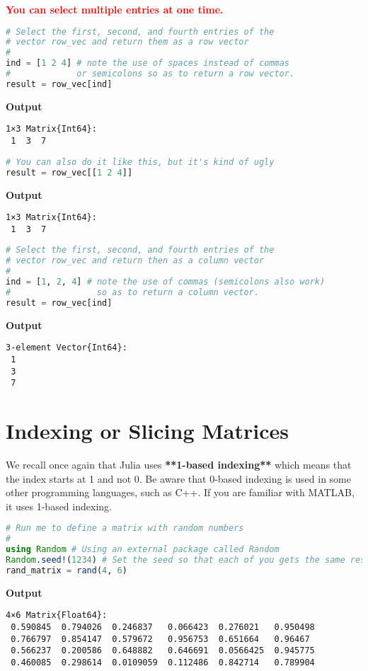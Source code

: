 \textcolor{red}{\bf You can select multiple entries at one time.}

\begin{lstlisting}[language=Julia,style=mystyle]
# Select the first, second, and fourth entries of the 
# vector row_vec and return them as a row vector
#
ind = [1 2 4] # note the use of spaces instead of commas 
#             or semicolons so as to return a row vector.
result = row_vec[ind]
\end{lstlisting}
\textbf{Output} 
\begin{verbatim}
1×3 Matrix{Int64}:
 1  3  7
\end{verbatim}


\begin{lstlisting}[language=Julia,style=mystyle]
# You can also do it like this, but it's kind of ugly
result = row_vec[[1 2 4]]
\end{lstlisting}
\textbf{Output} 
\begin{verbatim}
1×3 Matrix{Int64}:
 1  3  7
\end{verbatim}


\begin{lstlisting}[language=Julia,style=mystyle]
# Select the first, second, and fourth entries of the 
# vector row_vec and return then as a column vector
#
ind = [1, 2, 4] # note the use of commas (semicolons also work) 
#                 so as to return a column vector.
result = row_vec[ind]
\end{lstlisting}
\textbf{Output} 
\begin{verbatim}
3-element Vector{Int64}:
 1
 3
 7
\end{verbatim}

\section{Indexing or Slicing Matrices}

\begin{rem}
We recall once again that Julia uses \textbf{**1-based indexing**} which means that the index starts at 1 and not 0. Be aware that 0-based indexing is used in some other programming languages, such as C++. If you are familiar with MATLAB, it uses 1-based indexing.
\end{rem}

\begin{lstlisting}[language=Julia,style=mystyle]
# Run me to define a matrix with random numbers
#
using Random # Using an external package called Random 
Random.seed!(1234) # Set the seed so that each of you gets the same results. 
rand_matrix = rand(4, 6)
\end{lstlisting}
\textbf{Output} 
\begin{verbatim}
4×6 Matrix{Float64}:
 0.590845  0.794026  0.246837   0.066423  0.276021   0.950498
 0.766797  0.854147  0.579672   0.956753  0.651664   0.96467
 0.566237  0.200586  0.648882   0.646691  0.0566425  0.945775
 0.460085  0.298614  0.0109059  0.112486  0.842714   0.789904
\end{verbatim}



